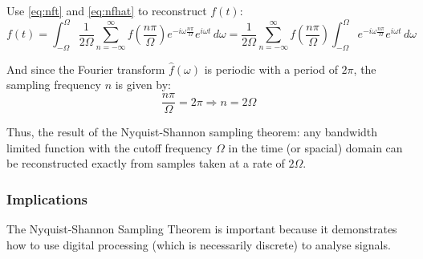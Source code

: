 \documentclass[12pt]{article}
\newcommand{\inftyint}{\int_{-\infty}^{\infty}}
\begin{document}
Use \eqref{eq:nft} and \eqref{eq:nfhat} to reconstruct \( f(t)  \):
\begin{equation} \label{eq:ndtft} f(t) = \int_{-\Omega}^{\Omega}
    \frac{1}{2\Omega} \sum_{n = -\infty}^{\infty} f(\frac{n\pi}{\Omega})e^{-i
    \omega \frac{n \pi}{\Omega} } e^{i\omega t} \,d\omega = \frac{1}{2\Omega}
    \sum_{n = -\infty}^{\infty} f(\frac{n\pi}{\Omega}) \int_{-\Omega}^{\Omega}
    e^{-i \omega \frac{n \pi}{\Omega} } e^{i\omega t} \, d\omega \end{equation}

And since the Fourier transform \( \hat{f}(\omega) \) is periodic with a period
of \( 2\pi\), the sampling frequency \( n\) is given by: \[ \frac{n\pi}{\Omega}
= 2\pi \Rightarrow n = 2\Omega\]

Thus, the result of the Nyquist-Shannon sampling theorem: any bandwidth limited
function with the cutoff frequency \( \Omega \) in the time (or spacial) domain
can be reconstructed exactly from samples taken at a rate of \( 2\Omega \).

%
%


\subsubsection{Implications}

The Nyquist-Shannon Sampling Theorem is important because it demonstrates how
to use digital processing (which is necessarily discrete) to analyse signals. 
\end{document}
